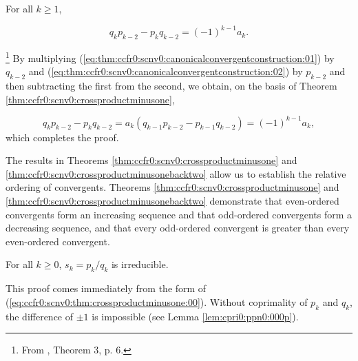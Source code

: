 \begin{vworktheoremstatement}
\label{thm:ccfr0:scnv0:crossproductminusonebacktwo}
For all $k \geq 1$,

\begin{equation}
q_k p_{k-2} - p_k q_{k-2} = (-1)^{k-1} a_k .
\end{equation}
\end{vworktheoremstatement}
\begin{vworktheoremproof}\hspace{-0.4em}\footnote{From
\cite{bibref:b:KhinchinClassic}, Theorem 3, p. 6.}
By multiplying (\ref{eq:thm:ccfr0:scnv0:canonicalconvergentconstruction:01}) 
by $q_{k-2}$ and 
(\ref{eq:thm:ccfr0:scnv0:canonicalconvergentconstruction:02}) 
by $p_{k-2}$ and then subtracting the first from the
second, we obtain, on the basis of Theorem 
\ref{thm:ccfr0:scnv0:crossproductminusone},

\begin{equation}
q_k p_{k-2} - p_k q_{k-2} 
= a_k (q_{k-1} p_{k-2} - p_{k-1} q_{k-2}) = (-1)^{k-1} a_k ,
\end{equation}
which completes the proof.
\end{vworktheoremproof}
\vworktheoremfooter{}

The results in Theorems \ref{thm:ccfr0:scnv0:crossproductminusone}
and \ref{thm:ccfr0:scnv0:crossproductminusonebacktwo} allow us
to establish the relative ordering of convergents.
Theorems \ref{thm:ccfr0:scnv0:crossproductminusone} and
\ref{thm:ccfr0:scnv0:crossproductminusonebacktwo} demonstrate that
even-ordered convergents form an increasing sequence and that odd-ordered
convergents form a decreasing sequence, and that every odd-ordered convergent
is greater than every even-ordered convergent.

\begin{vworktheoremstatement}
\label{thm:ccfr0:scnv0:irreducibility}
For all $k \geq 0$, $s_k = p_k/q_k$ is
irreducible.
\end{vworktheoremstatement}
\begin{vworktheoremproof}
This proof comes immediately from the form
of (\ref{eq:ccfr0:scnv0:thm:crossproductminusone:00}).
Without coprimality of $p_k$ and $q_k$, the difference
of $\pm 1$ is impossible (see
\cprizeroxrefcomma{}Lemma \ref{lem:cpri0:ppn0:000p}).
\end{vworktheoremproof}

